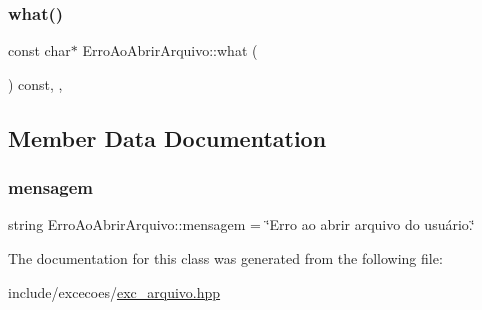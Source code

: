 \subsubsection{\texorpdfstring{what()}{what()}}
{\footnotesize\ttfamily const char$\ast$ Erro\+Ao\+Abrir\+Arquivo\+::what (\begin{DoxyParamCaption}{ }\end{DoxyParamCaption}) const\hspace{0.3cm}{\ttfamily [inline]}, {\ttfamily [override]}, {\ttfamily [noexcept]}}



\subsection{Member Data Documentation}
\mbox{\label{classErroAoAbrirArquivo_a96c16ba42b2fbb0cfb8aed38801748f0}} 
\subsubsection{\texorpdfstring{mensagem}{mensagem}}
{\footnotesize\ttfamily string Erro\+Ao\+Abrir\+Arquivo\+::mensagem = \char`\"{}Erro ao abrir arquivo do usuário.\char`\"{}\hspace{0.3cm}{\ttfamily [private]}}



The documentation for this class was generated from the following file\+:\begin{DoxyCompactItemize}
\item 
include/excecoes/\hyperlink{exc__arquivo_8hpp}{exc\+\_\+arquivo.\+hpp}\end{DoxyCompactItemize}
